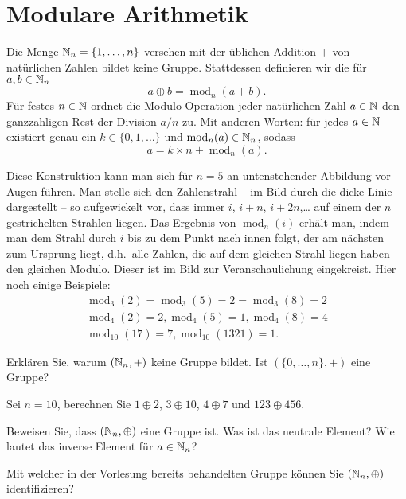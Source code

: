 \documentclass{scrartcl}
\renewcommand{\mod}{\operatorname{mod}}
\begin{document}
\section{Modulare Arithmetik }

Die Menge $\mathbb{N}_n = \{1,\ldots,n\}$ versehen mit der üblichen Addition $+$ von natürlichen Zahlen bildet keine Gruppe.
Stattdessen definieren wir die  für $a, b \in \mathbb{N}_n$
\[
  a \oplus b = \mod_n(a + b).
\]
Für festes $n \in \mathbb{N}$ ordnet die Modulo-Operation jeder natürlichen Zahl $a \in \mathbb{N}$ den ganzzahligen Rest der Division $a / n$ zu.
Mit anderen Worten: für jedes $a \in \mathbb{N}$ existiert genau ein $k \in \{0, 1, \ldots \}$ und $\mod_n(a) \in \NN_n$, sodass
\[
  a = k \times n + \mod_n(a).
\]

Diese Konstruktion kann man sich für $n=5$ an untenstehender Abbildung vor Augen führen.
Man stelle sich den Zahlenstrahl -- im Bild durch die dicke Linie dargestellt -- so aufgewickelt vor, dass immer $i$, $i + n$, $i + 2n$,\ldots{} auf einem der $n$ gestrichelten Strahlen liegen.
Das Ergebnis von $\mod_n(i)$ erhält man, indem man dem Strahl durch $i$ bis zu dem Punkt nach innen folgt, der am nächsten zum Ursprung liegt, d.h.\ alle Zahlen, die auf dem gleichen Strahl liegen haben den gleichen Modulo.
Dieser ist im Bild zur Veranschaulichung eingekreist.
Hier noch einige Beispiele:
\begin{align*}
  \mod_3(2) = \mod_3(5)=2 = \mod_3(8)= 2 \\
  \mod_4(2) = 2, \mod_4(5) = 1, \mod_4(8) = 4\\
  \mod_{10}(17) = 7, \mod_{10}(1321) = 1.
\end{align*}

\newpage
\begin{subex}
  \item{} Erklären Sie, warum $(\mathbb{N}_n, +)$ keine Gruppe bildet.
  Ist $(\{0, \ldots, n\},+)$ eine Gruppe?
  \item{} Sei $n=10$, berechnen Sie $1 \oplus 2$, $3 \oplus 10$, $4 \oplus 7$ und $123 \oplus 456$.
  \item{} Beweisen Sie, dass $(\mathbb{N}_n,\oplus)$ eine Gruppe ist.
  Was ist das neutrale Element?
  Wie lautet das inverse Element für $a\in\mathbb{N}_n$?
  \item{} Mit welcher in der Vorlesung bereits behandelten Gruppe können Sie $(\mathbb{N}_n,\oplus)$ identifizieren?
\end{subex}
\end{document}
